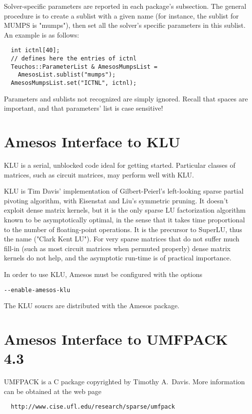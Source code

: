 \documentclass[11pt]{SANDreport}
\begin{document}
Solver-specific parameters are reported in each package's subsection.
The general procedure is to create a sublist with a given name (for
instance, the sublist for MUMPS is "mumps"), then set all the
solver's specific parameters in this sublist. An example is as follows:
\begin{verbatim}
  int ictnl[40];
  // defines here the entries of ictnl
  Teuchos::ParameterList & AmesosMumpsList = 
    AmesosList.sublist("mumps");
  AmesosMumpsList.set("ICTNL", ictnl);
\end{verbatim}
Parameters and sublists not recognized are simply ignored. Recall that
spaces are important, and that parameters' list is case sensitive!


\section{Amesos Interface to KLU}
\label{sec:klu}

KLU is a serial, unblocked code ideal for getting started. Particular
classes of matrices, such as circuit matrices, may perform well with KLU.

KLU is Tim Davis' implementation of Gilbert-Peierl's left-looking sparse
partial pivoting algorithm, with Eisenstat and Liu's symmetric pruning.
It doesn't exploit dense matrix kernels, but it is the only sparse LU
factorization algorithm known to be asymptotically optimal, in the sense
that it takes time proportional to the number of floating-point
operations. It is the precursor to SuperLU, thus the name ("Clark Kent
LU"). For very sparse matrices that do not suffer much fill-in (such as
most circuit matrices when permuted properly) dense matrix kernels do
not help, and the asymptotic run-time is of practical importance.

\smallskip

In order to use KLU, Amesos must be configured with the options
\begin{verbatim}
--enable-amesos-klu
\end{verbatim}
The KLU soucrs are distributed with the Amesos package.


\section{Amesos Interface to UMFPACK 4.3}
\label{sec:umfpack}

UMFPACK is a C package copyrighted by Timothy A.~Davis. More information
can be obtained at the web page
\begin{verbatim}
  http://www.cise.ufl.edu/research/sparse/umfpack
\end{verbatim}
\end{document}
